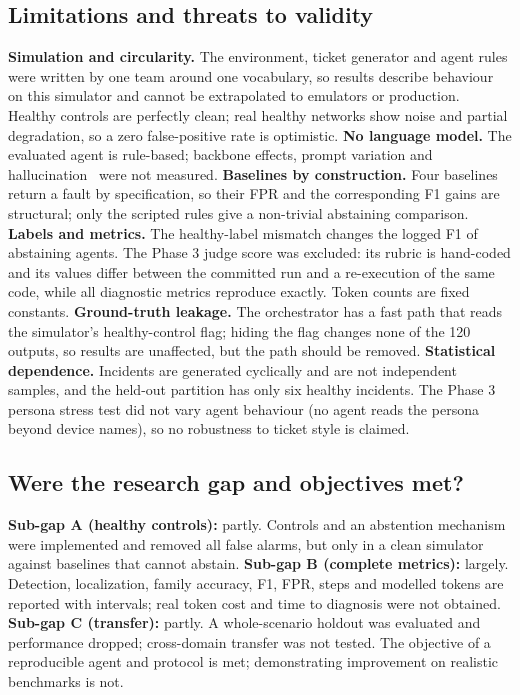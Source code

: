 \documentclass[pdflatex,sn-basic,Numbered,iicol]{sn-jnl}
\begin{document}
\subsection{Limitations and threats to validity}\label{sec:threats}
\textbf{Simulation and circularity.} The environment, ticket generator and agent rules were written by one team around one vocabulary, so results describe behaviour on this simulator and cannot be extrapolated to emulators or production. Healthy controls are perfectly clean; real healthy networks show noise and partial degradation, so a zero false-positive rate is optimistic. \textbf{No language model.} The evaluated agent is rule-based; backbone effects, prompt variation and hallucination~\cite{kim2026agents} were not measured. \textbf{Baselines by construction.} Four baselines return a fault by specification, so their FPR and the corresponding F1 gains are structural; only the scripted rules give a non-trivial abstaining comparison. \textbf{Labels and metrics.} The healthy-label mismatch changes the logged F1 of abstaining agents. The Phase 3 judge score was excluded: its rubric is hand-coded and its values differ between the committed run and a re-execution of the same code, while all diagnostic metrics reproduce exactly. Token counts are fixed constants. \textbf{Ground-truth leakage.} The orchestrator has a fast path that reads the simulator's healthy-control flag; hiding the flag changes none of the 120 outputs, so results are unaffected, but the path should be removed. \textbf{Statistical dependence.} Incidents are generated cyclically and are not independent samples, and the held-out partition has only six healthy incidents. The Phase 3 persona stress test did not vary agent behaviour (no agent reads the persona beyond device names), so no robustness to ticket style is claimed.

\subsection{Were the research gap and objectives met?}
\textbf{Sub-gap A (healthy controls):} partly. Controls and an abstention mechanism were implemented and removed all false alarms, but only in a clean simulator against baselines that cannot abstain. \textbf{Sub-gap B (complete metrics):} largely. Detection, localization, family accuracy, F1, FPR, steps and modelled tokens are reported with intervals; real token cost and time to diagnosis were not obtained. \textbf{Sub-gap C (transfer):} partly. A whole-scenario holdout was evaluated and performance dropped; cross-domain transfer was not tested. The objective of a reproducible agent and protocol is met; demonstrating improvement on realistic benchmarks is not.
\end{document}
